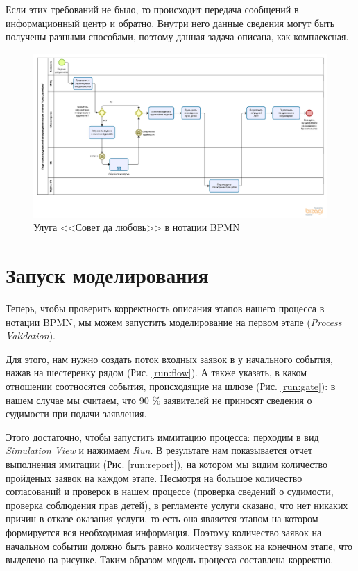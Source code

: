 Если этих требований не было, то происходит передача сообщений
в информационный центр и обратно. Внутри него данные сведения
могут быть получены разными способами, поэтому данная задача
описана, как комплексная.

\begin{figure}
    \centering
    \includegraphics[width=\textwidth]{figures/model-description}
    \caption{Улуга <<Совет да любовь>> в нотации BPMN}
    \label{description}
\end{figure}

\clearpage
\section{Запуск моделирования}

Теперь, чтобы проверить корректность описания этапов нашего
процесса в нотации BPMN, мы можем запустить моделирование на
первом этапе (\textit{Process Validation}).

Для этого, нам нужно создать поток входных заявок в у
начального события, нажав на шестеренку рядом (Рис. \ref{run:flow}).
А также указать, в каком отношении соотносятся события,
происходящие на шлюзе (Рис. \ref{run:gate}): в нашем случае
мы считаем, что 90 \% заявителей не приносят сведения о судимости
при подачи заявления.
\clearpage


Этого достаточно, чтобы запустить иммитацию процесса: перходим
в вид \textit{Simulation View} и нажимаем \textit{Run}.
В результате нам показывается отчет выполнения имитации (Рис. \ref{run:report}),
на котором мы видим количество пройденых заявок на каждом этапе.
Несмотря на большое количество согласований и проверок в нашем
процессе (проверка сведений о судимости, проверка соблюдения
прав детей), в регламенте услуги сказано, что нет никаких причин
в отказе оказания услуги, то есть она является этапом на котором
формируется вся необходимая информация. Поэтому количество
заявок на начальном событии должно быть равно количеству
заявок на конечном этапе, что выделено на рисунке.
Таким образом модель процесса составлена корректно.
